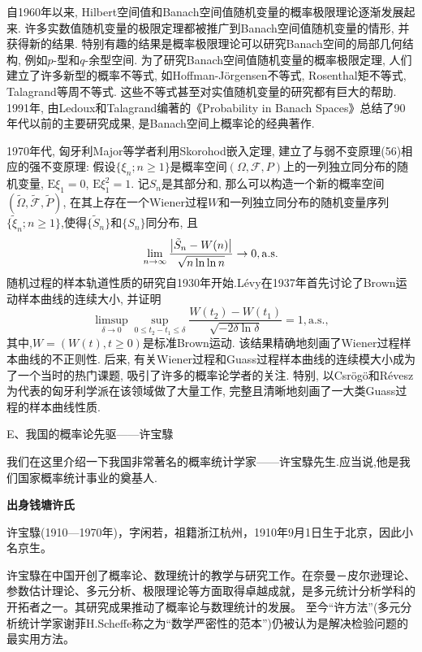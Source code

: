 \documentclass[a4paper,AutoFakeBold,oneside,12pt]{article}
\begin{document}
自1960年以来, Hilbert空间值和Banach空间值随机变量的概率极限理论逐渐发展起来. 许多实数值随机变量的极限定理都被推广到Banach空间值随机变量的情形, 并获得新的结果. 特别有趣的结果是概率极限理论可以研究Banach空间的局部几何结构, 例如$p$-型和$q$-余型空间. 为了研究Banach空间值随机变量的概率极限定理, 人们建立了许多新型的概率不等式, 如Hoffman-Jörgensen不等式, Rosenthal矩不等式, Talagrand等周不等式. 这些不等式甚至对实值随机变量的研究都有巨大的帮助. 1991年, 由Ledoux和Talagrand编著的《Probability in Banach Spaces》总结了90年代以前的主要研究成果, 是Banach空间上概率论的经典著作.

1970年代, 匈牙利Major等学者利用Skorohod嵌入定理, 建立了与弱不变原理(56)相应的强不变原理: 假设$\{\xi_n;n\geqslant 1\}$是概率空间$(\Omega,\mathscr{F},P)$上的一列独立同分布的随机变量, $\mathrm{E}\xi_1= 0$, $\mathrm{E}\xi_1^2 = 1$. 记$S_n$是其部分和, 那么可以构造一个新的概率空间$(\tilde{\Omega},\tilde{\mathscr{F}},\tilde{P})$, 在其上存在一个Wiener过程$W$和一列独立同分布的随机变量序列$\{ \tilde{\xi}_n;n\geqslant 1 \}$,使得$\{\tilde{S}_n\}$和$\{S_n\}$同分布, 且\begin{equation}
	\lim_{n\to\infty}\frac{\abs{\tilde{S}_n-W(n)}}{\sqrt{n\ln\ln n}}\to 0 ,\mathrm{a.s.}
\end{equation}
随机过程的样本轨道性质的研究自1930年开始.Lévy在1937年首先讨论了Brown运动样本曲线的连续大小, 并证明\begin{equation}
	\limsup_{\delta\to 0}\sup_{0\leqslant t_2-t_1\leqslant \delta}\frac{W(t_2)-W(t_1)}{\sqrt{-2\delta\ln\delta}} = 1,\mathrm{a.s.},
\end{equation}
其中,$W = (W(t),t\geqslant 0)$是标准Brown运动. 该结果精确地刻画了Wiener过程样本曲线的不正则性. 后来, 有关Wiener过程和Guass过程样本曲线的连续模大小成为了一个当时的热门课题, 吸引了许多的概率论学者的关注. 特别, 以Csrögö和Révesz为代表的匈牙利学派在该领域做了大量工作, 完整且清晰地刻画了一大类Guass过程的样本曲线性质.

E、我国的概率论先驱——许宝騄

我们在这里介绍一下我国非常著名的概率统计学家——许宝騄先生.应当说,他是我们国家概率统计事业的奠基人.

\textbf{出身钱塘许氏}

许宝騄(1910—1970年)，字闲若，祖籍浙江杭州，1910年9月1日生于北京，因此小名京生。

许宝騄在中国开创了概率论、数理统计的教学与研究工作。在奈曼－皮尔逊理论、参数估计理论、多元分析、极限理论等方面取得卓越成就，是多元统计分析学科的开拓者之一。其研究成果推动了概率论与数理统计的发展。 至今“许方法”(多元分析统计学家谢菲H.Scheffe称之为“数学严密性的范本”)仍被认为是解决检验问题的最实用方法。
\end{document}
